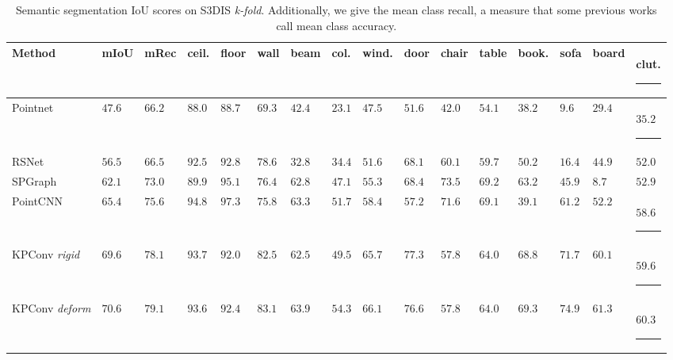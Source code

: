 \documentclass[10pt,twocolumn,letterpaper]{article}
\newcommand\Tstrut{\rule{-3pt}{2.6ex}}       %
\newcommand\Bstrut{\rule[-0.9ex]{-3pt}{0pt}} %
\begin{document}
\begin{table}[t]
\setlength\tabcolsep{0.5pt}
\begin{small}
\begin{center}
\begin{tabular}{L{2.4cm} | C{1.0cm} | C{1.0cm} | *{13}{C{0.9cm}}}
Method	 & mIoU & mRec & ceil.	 & floor	 & wall	 & beam	 & col.	 & wind.	 & door	 & chair	 & table	 & book.	 & sofa	 & board & clut.	\Bstrut\\
\hline
Pointnet \cite{qi2017pointnet}	& $47.6$	& $66.2$	& $88.0$	& $88.7$	& $69.3$	& $42.4$	& $23.1$	& $47.5$	& $51.6$	& $42.0$	& $54.1$	& $38.2$	& $9.6$	& $29.4$	& $35.2$	\Tstrut\\
RSNet \cite{huang2018recurrent}	& $56.5$	& $66.5$	& $92.5$	& $92.8$	& $78.6$	& $32.8$	& $34.4$	& $51.6$	& $68.1$	& $60.1$	& $59.7$	& $50.2$	& $16.4$	& $44.9$	& $52.0$	\\
SPGraph \cite{landrieu2018large}	& $62.1$	& $73.0$	& $89.9$	& $95.1$	& $76.4$	& $62.8$	& $47.1$	& $55.3$	& $68.4$	& $\mathbf{73.5}$	& $\mathbf{69.2}$	& $63.2$	& $45.9$	& $8.7$	& $52.9$	\\
PointCNN \cite{li2018pointcnn}	& $65.4$	& $75.6$	& $\mathbf{94.8}$	& $\mathbf{97.3}$	& $75.8$	& $63.3$	& $51.7$	& $58.4$	& $57.2$	& $71.6$	& $69.1$	& $39.1$	& $61.2$	& $52.2$	& $58.6$	\Bstrut\\
\hline
KPConv \textit{rigid}	& $69.6$	& $78.1$	& $93.7$	& $92.0$	& $82.5$	& $62.5$	& $49.5$	& $65.7$	& $\mathbf{77.3}$	& $57.8$	& $64.0$	& $68.8$	& $71.7$	& $60.1$	& $59.6$	\Tstrut\\
KPConv \textit{deform}	& $\mathbf{70.6}$	& $\mathbf{79.1}$	& $93.6$	& $92.4$	& $\mathbf{83.1}$	& $\mathbf{63.9}$	& $\mathbf{54.3}$	& $\mathbf{66.1}$	& $76.6$	& $57.8$	& $64.0$	& $\mathbf{69.3}$	& $\mathbf{74.9}$	& $\mathbf{61.3}$	& $\mathbf{60.3}$	\Bstrut\\
\hline
\end{tabular}
\end{center}
\end{small}
\caption{Semantic segmentation IoU scores on S3DIS \textit{k-fold}. Additionally, we give the mean class recall, a measure that some previous works call mean class accuracy.}
\label{Table_S3DIS_kfold} 
\end{table}
\end{document}
